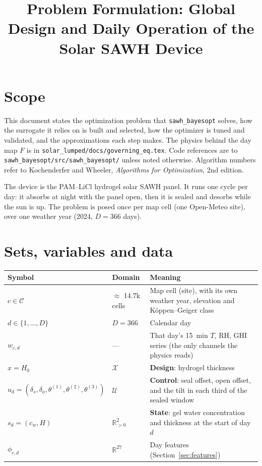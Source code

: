\documentclass[11pt]{article}
\title{Problem Formulation: Global Design and Daily Operation of the Solar SAWH Device}
\author{}
\date{}
\newcommand{\code}[1]{\texttt{#1}}
\begin{document}
\maketitle

\section*{Scope}

This document states the optimization problem that \code{sawh\_bayesopt} solves, how the
surrogate it relies on is built and selected, how the optimizer is tuned and validated, and
the approximations each step makes. The physics behind the day map $F$ is in
\code{solar\_lumped/docs/governing\_eq.tex}. Code references are to
\code{sawh\_bayesopt/src/sawh\_bayesopt/} unless noted otherwise. Algorithm numbers refer to
Kochenderfer and Wheeler, \emph{Algorithms for Optimization}, 2nd edition.

The device is the PAM--LiCl hydrogel solar SAWH panel. It runs one cycle per day: it
absorbs at night with the panel open, then it is sealed and desorbs while the sun is up. The
problem is posed once per map cell (one Open-Meteo site), over one weather year (2024,
$D = 366$ days).

\section{Sets, variables and data}

\begin{table}[h]
\centering
\small
\begin{tabular}{@{}llp{}@{}}
\toprule
\textbf{Symbol} & \textbf{Domain} & \textbf{Meaning} \\
\midrule
$c \in \mathcal{C}$ & $\approx$ 14.7k cells & Map cell (site), with its own weather year, elevation and K\"oppen--Geiger class \\
$d \in \{1,\dots,D\}$ & $D = 366$ & Calendar day \\
$w_{c,d}$ & --- & That day's \SI{15}{\minute} $T$, RH, GHI series (the only channels the physics reads) \\
$x = H_0$ & $\mathcal{X}$ & \textbf{Design}: hydrogel thickness \\
$u_d = (\delta_s, \delta_o, \theta^{(1)}, \theta^{(2)}, \theta^{(3)})$ & $\mathcal{U}$ & \textbf{Control}: seal offset, open offset, and the tilt in each third of the sealed window \\
$s_d = (c_w, H)$ & $\mathbb{R}_{>0}^2$ & \textbf{State}: gel water concentration and thickness at the start of day $d$ \\
$\phi_{c,d}$ & $\mathbb{R}^{27}$ & Day features (Section~\ref{sec:features}) \\
\bottomrule
\end{tabular}
\end{table}
\end{document}
